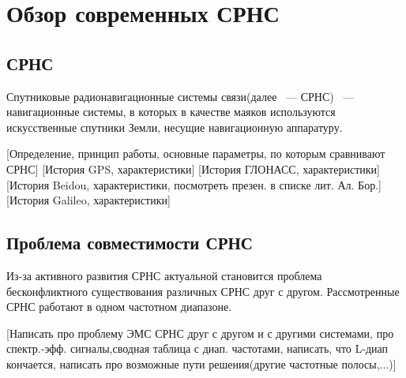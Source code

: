 \documentclass[a4paper,12pt]{report} %
\begin{document}
\chapter{Обзор современных СРНС}
\section{СРНС}
Спутниковые радионавигационные системы связи(далее ~--- СРНС) ~--- навигационные системы, в которых в качестве маяков используются искусственные спутники Земли, несущие навигационную аппаратуру. 

[Определение, принцип работы, основные параметры, по которым сравнивают СРНС]
[История GPS, характеристики]
[История ГЛОНАСС, характеристики]
[История Beidou, характеристики, посмотреть презен. в списке лит. Ал. Бор.]
[История Galileo, характеристики]
\section{Проблема совместимости СРНС}
Из-за активного развития СРНС актуальной становится проблема бесконфликтного существования различных СРНС друг с другом. Рассмотренные СРНС работают в одном частотном диапазоне. 

[Написать про проблему ЭМС СРНС друг с другом и с другими системами, про спектр.-эфф. сигналы,сводная таблица с диап. частотами, написать, что L-диап кончается, написать про возможные пути решения(другие частотные полосы,...)]
\end{document}
